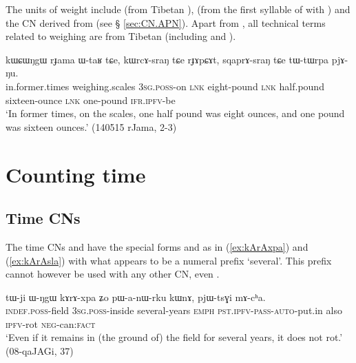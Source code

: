 The units of weight include  (from Tibetan ),   (from the first syllable of  with ) and the CN  derived from  (see § \ref{sec:CN.APN}). Apart from , all technical terms related to weighing are from Tibetan (including  and ).

\begin{exe}
\ex \label{ex:sqaprAsrang}
\gll kɯɕɯŋgɯ rɟama ɯ-taʁ tɕe, kɯrcɤ-sraŋ tɕe rɟɤpɕɤt,  sqaprɤ-sraŋ tɕe tɯ-tɯrpa pjɤ-ŋu. \\
in.former.times weighing.scales \textsc{3sg}.\textsc{poss}-on \textsc{lnk} eight-pound \textsc{lnk} half.pound sixteen-ounce \textsc{lnk} one-pound \textsc{ifr}.\textsc{ipfv}-be \\
\glt  `In former times, on the scales, one half pound was eight ounces, and one pound was sixteen ounces.' (140515 rJama, 2-3)
\end{exe}
 

\section{Counting time} \label{sec:time}
\subsection{Time CNs} \label{sec:CN.time}
  
The time CNs  and  have the special forms  and  as in (\ref{ex:kArAxpa}) and (\ref{ex:kArAsla}) with what appears to be a numeral prefix  `several'. This prefix cannot however be used with any other CN, even . 

\begin{exe}
\ex \label{ex:kArAxpa}
\gll tɯ-ji ɯ-ŋgɯ kɤrɤ-xpa ʑo pɯ-a-nɯ-rku kɯnɤ, pjɯ-tsɣi mɤ-cʰa. \\
\textsc{indef}.\textsc{poss}-field \textsc{3sg}.\textsc{poss}-inside several-years \textsc{emph} \textsc{pst}.\textsc{ipfv}-\textsc{pass}-\textsc{auto}-put.in also \textsc{ipfv}-rot \textsc{neg}-can:\textsc{fact} \\
\glt `Even if it remains in (the ground of) the field for several years, it does not rot.' (08-qaJAGi, 37)
\end{exe}

